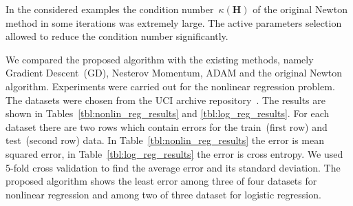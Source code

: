 \documentclass[
11pt,%
tightenlines,%
twoside,%
onecolumn,%
nofloats,%
nobibnotes,%
nofootinbib,%
superscriptaddress,%
noshowpacs,%
centertags]%
{revtex4}
\newcommand{\bH}{\mathbf{H}}
\begin{document}
In the considered examples the condition number~$\kappa (\bH)$ of the original Newton method in some iterations was extremely large. 
The active parameters selection allowed to reduce the condition number significantly. 

We compared the proposed algorithm with the existing methods, namely Gradient Descent~(GD), Nesterov Momentum, ADAM and the original Newton algorithm. 
Experiments were carried out for the nonlinear regression problem. 
The datasets were chosen from the UCI archive repository~\cite{uci2017}. 
The results are shown in Tables~\ref{tbl:nonlin_reg_results} and \ref{tbl:log_reg_results}. 
For each dataset there are two rows which contain errors for the train~(first row) and test~(second row) data. 
In Table~\ref{tbl:nonlin_reg_results} the error is mean squared error, in Table~\ref{tbl:log_reg_results} the error is cross entropy.
We used 5-fold cross validation to find the average error and its standard deviation. 
The proposed algorithm shows the least error among three of four datasets for nonlinear regression and among two of three dataset for logistic regression. 
\end{document}
